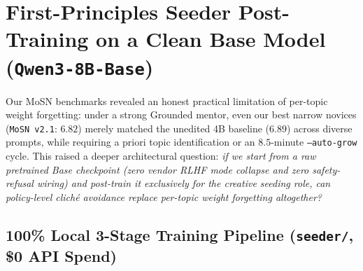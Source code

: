 \documentclass[10.5pt,letterpaper]{article}
\begin{document}
\section{First-Principles Seeder Post-Training on a Clean Base Model (\texttt{Qwen3-8B-Base})}

Our MoSN benchmarks revealed an honest practical limitation of per-topic weight forgetting: under a strong Grounded mentor, even our best narrow novices (\texttt{MoSN v2.1}: $6.82$) merely matched the unedited 4B baseline ($6.89$) across diverse prompts, while requiring a priori topic identification or an $8.5$-minute \texttt{--auto-grow} cycle. This raised a deeper architectural question: \emph{if we start from a raw pretrained Base checkpoint (zero vendor RLHF mode collapse and zero safety-refusal wiring) and post-train it exclusively for the creative seeding role, can policy-level cliché avoidance replace per-topic weight forgetting altogether?}

\subsection{100\% Local 3-Stage Training Pipeline (\texttt{seeder/}, \$0 API Spend)}
\end{document}
